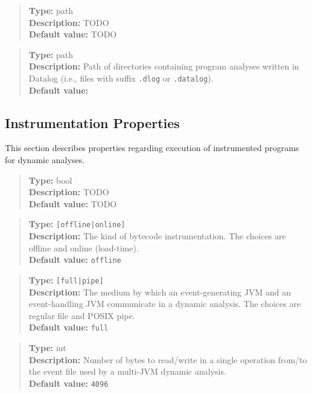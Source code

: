 \begin{quote}
{\bf Type:} path \\
{\bf Description:} TODO \\
{\bf Default value:} TODO
\end{quote}

\begin{quote}
{\bf Type:} path  \\
{\bf Description:} Path of directories containing program analyses written in Datalog (i.e., files with suffix {\tt .dlog} or {\tt .datalog}). \\
{\bf Default value:} 
\end{quote}

\subsection{Instrumentation Properties}
\label{sec:instr-props}

This section describes properties regarding execution of instrumented programs for dynamic analyses.
\\[10pt]

\begin{quote}
{\bf Type:} bool \\
{\bf Description:} TODO \\
{\bf Default value:} TODO
\end{quote}

\begin{quote}
{\bf Type:} {\tt [offline|online]}  \\
{\bf Description:} The kind of bytecode instrumentation.  The choices are offline and online (load-time).  \\
{\bf Default value:} {\tt offline}
\end{quote}

\begin{quote}
{\bf Type:} {\tt [full|pipe]}  \\
{\bf Description:} The medium by which an event-generating JVM and an event-handling JVM communicate in a dynamic analysis.  The choices are regular file and POSIX pipe.  \\
{\bf Default value:} {\tt full} 
\end{quote}

\begin{quote}
{\bf Type:} int \\
{\bf Description:} Number of bytes to read/write in a single operation from/to the event file used by a multi-JVM dynamic analysis. \\
{\bf Default value:} {\tt 4096}
\end{quote}


